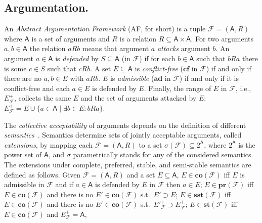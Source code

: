 \documentclass[conference]{IEEEtran}
\newcommand{\powerset}[1]{\ensuremath{2^{#1}}} %
\newcommand{\AF}{\ensuremath{\mathcal{F}}\xspace} %
\newcommand{\F}{\ensuremath{\mathcal{F}}\xspace} %
\newcommand{\args}{\ensuremath{\mathsf{A}}\xspace} %
\newcommand{\atts}{\ensuremath{R}\xspace}
\newcommand{\attackers}[2]{\ensuremath{\mathcal{F}_{#1}(#2)\xspace}} %
\newcommand{\AFC}{\ensuremath{\AF=(\args,\atts)}\xspace} %
\newcommand{\cA}{\ensuremath{\mathcal{A}}} %
\newcommand{\cB}{\ensuremath{\mathcal{B}}} %
\newcommand{\cC}{\ensuremath{\mathcal{C}}} %
\newcommand{\af}{AF}
\newcommand{\cf}{\mathbf{cf}}
\newcommand{\ad}{\mathbf{ad}}
\newcommand{\co}{\mathbf{co}}
\newcommand{\pr}{\mathbf{pr}}
\newcommand{\st}{\mathbf{st}}
\newcommand{\sst}{\mathbf{sst}}
\begin{document}
\subsection{Argumentation.}\label{sect:bgarg} An \emph{Abstract Argumentation Framework} (\af, for short) \cite{Dung:1995}
is a tuple $\F=(\args,\atts)$ where
\args is a set of arguments and
\atts is a relation $\atts\subseteq \args\times\args$.
For two arguments $a,b\in\args$ the relation $a \atts b$ means that argument $a$ \emph{attacks} argument $b$.
An argument $a \in \args$ is \emph{defended} by $S \subseteq \args$ (in $\F$)
if for each $b \in \args$ such that $b \atts a$
there is some $c \in S$ such that $c \atts b$.
A set $E \subseteq \args$ is \emph{conflict-free} ($\cf$ in \F) if and only if there are no $a,b\in E$ with $a \atts b$.
$E$ is \emph{admissible} ($\ad$ in \F) if and only if it is conflict-free and each $a \in E$ is defended by $E$.
Finally, the range of $E$ in $\F$, i.e., $E^{+}_\F$, collects the same $E$ and the set of arguments attacked by $E$: $E^{+}_\F=E \cup \{a\in\args \mid \exists b\in E: b \atts a\}$.


The \emph{collective acceptability} of  arguments depends on the definition of
different \textit{semantics}~\cite{Dung:1995}.  Semantics determine
sets of jointly acceptable arguments, called \emph{extensions}, by
mapping each \AFC to a set $\sigma(\F) \subseteq \powerset{\args}$, where $\powerset{\args}$ is the  power set of $\args$, and $\sigma$ parametrically stands for any of the considered semantics.
The extensions under complete, preferred, stable,  and semi-stable
semantics are defined as follows.
Given \AFC and a set $E \subseteq \args$, $E \in \co(\F)$ iff $E$ is admissible in $\F$ and if $a \in \args$ is defended by $E$ in $\F$ then $a\in E$;  $E \in \pr(\F)$ iff $E \in \co(\F)$ and there is no $E' \in \co(\F)$ s.t.\ $E' \supset E$; $E \in \sst(\F)$ iff $E \in \co(\F)$ and there is no $E' \in \co(\F)$ s.t.\ $E'^+_\F \supset E^+_\F$; $E \in \st(\F)$ iff $E \in \co(\F)$ and $E^+_\F = \args$,
\end{document}
